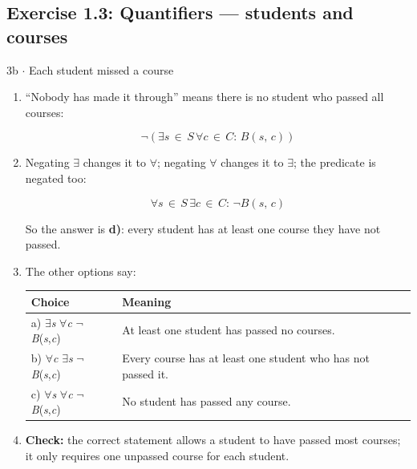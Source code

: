 \documentclass[11pt]{article}
\begin{document}
\begin{keepsection}\subsection{Exercise 1.3: Quantifiers — students and courses}

\begin{workedbox}{3b \ensuremath{\cdot} Each student missed a course}
\begin{enumerate}
\item {}
“Nobody has made it through” means there is no student who passed all courses:

\begin{equation*}\neg (\exists {s}\, \in \, {S}\, \forall {c}\, \in \, {C}:\, {B}({s},\, {c}))\end{equation*}
\item {}
Negating \ensuremath{\exists} changes it to \ensuremath{\forall}; negating \ensuremath{\forall} changes it to \ensuremath{\exists}; the predicate is negated too:

\begin{equation*}\forall {s}\, \in \, {S}\, \exists {c}\, \in \, {C}:\, \neg {B}({s},\, {c})\end{equation*}

So the answer is \textbf{d)}: every student has at least one course they have not passed.
\item {}
The other options say:

\begin{center}\small\begin{tabularx}{\linewidth}{>{\raggedright\arraybackslash}X>{\raggedright\arraybackslash}X}\toprule
\textbf{Choice} & \textbf{Meaning} \\ \midrule
a) \ensuremath{\exists}\textit{s} \ensuremath{\forall}\textit{c} \ensuremath{\neg}\textit{B}(\textit{s},\textit{c}) & At least one student has passed no courses. \\
b) \ensuremath{\forall}\textit{c} \ensuremath{\exists}\textit{s} \ensuremath{\neg}\textit{B}(\textit{s},\textit{c}) & Every course has at least one student who has not passed it. \\
c) \ensuremath{\forall}\textit{s} \ensuremath{\forall}\textit{c} \ensuremath{\neg}\textit{B}(\textit{s},\textit{c}) & No student has passed any course. \\
\bottomrule\end{tabularx}\end{center}
\item \textbf{Check:} the correct statement allows a student to have passed most courses; it only requires one unpassed course for each student.
\end{enumerate}
\end{workedbox}

\end{keepsection}
\end{document}
